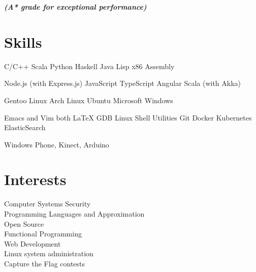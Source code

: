 \documentclass[a4paper]{deedy-resume} %
\begin{document}
\begin{minipage}[t]{0.33\textwidth}
  {\footnotesize \textit{\textbf{(A* grade for exceptional performance) }}} \\

  \sectionspace

  \section{Skills}

  \runsubsection{}
  C/C++ \textbullet{} Scala \textbullet{} Python \textbullet{} Haskell
  \textbullet{} Java \textbullet{} Lisp \textbullet{} x86 Assembly

  \sectionspace
  \sectionspace

  Node.js (with Express.js) \textbullet{} JavaScript \textbullet{} TypeScript
  \textbullet{} Angular \textbullet Scala (with Akka) \\

  \sectionspace
  \sectionspace

  Gentoo Linux \textbullet{} Arch Linux \textbullet{} Ubuntu \textbullet{}
  Microsoft Windows

  \sectionspace
  \sectionspace

  Emacs and Vim both \textbullet{} \LaTeX \textbullet{} GDB \textbullet{}
  Linux Shell Utilities \textbullet{} Git \textbullet{} Docker \textbullet{}
  Kubernetes \textbullet ElasticSearch

  \sectionspace
  \sectionspace

  Windows Phone, Kinect, Arduino

  \section{Interests}
  Computer Systems Security\\
  Programming Languages and Approximation\\
  Open Source\\
  Functional Programming\\
  Web Development\\
  Linux system administration\\
  Capture the Flag contests

\end{minipage}
\hfill
\end{document}
